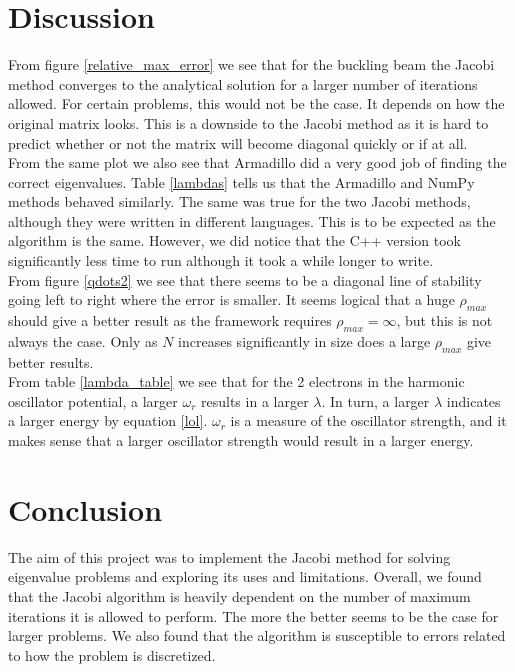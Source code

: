 \documentclass[notitlepage, reprint, nofootinbib]{revtex4-1}
\begin{document}
\section{Discussion}
From figure \ref{relative_max_error} we see that for the buckling beam the Jacobi method converges to the analytical solution for a larger number of iterations allowed. For certain problems, this would not be the case. It depends on how the original matrix looks. This is a downside to the Jacobi method as it is hard to predict whether or not the matrix will become diagonal quickly or if at all.\\[2mm]
From the same plot we also see that Armadillo did a very good job of finding the correct eigenvalues. Table \ref{lambdas} tells us that the Armadillo and NumPy methods behaved similarly. The same was true for the two Jacobi methods, although they were written in different languages. This is to be expected as the algorithm is the same. However, we did notice that the C++ version took significantly less time to run although it took a while longer to write. \\[2mm]
From figure \ref{qdots2} we see that there seems to be a diagonal line of stability going left to right where the error is smaller. It seems logical that a huge $\rho_{max}$ should give a better result as the framework requires $\rho_{max}=\infty$, but this is not always the case. Only as $N$ increases significantly in size does a large $\rho_{max}$ give better results. \\[2mm]
From table \ref{lambda_table} we see that for the 2 electrons in the harmonic oscillator potential, a larger $\omega_r$ results in a larger $\lambda$. In turn, a larger $\lambda$ indicates a larger energy by equation \ref{lol}. $\omega_r$ is a measure of the oscillator strength, and it makes sense that a larger oscillator strength would result in a larger energy. 

\section{Conclusion}
The aim of this project was to implement the Jacobi method for solving eigenvalue problems and exploring its uses and limitations. Overall, we found that the Jacobi algorithm is heavily dependent on the number of maximum iterations it is allowed to perform. The more the better seems to be the case for larger problems. We also found that the algorithm is susceptible to errors related to how the problem is discretized. 


\onecolumngrid


\end{document}
